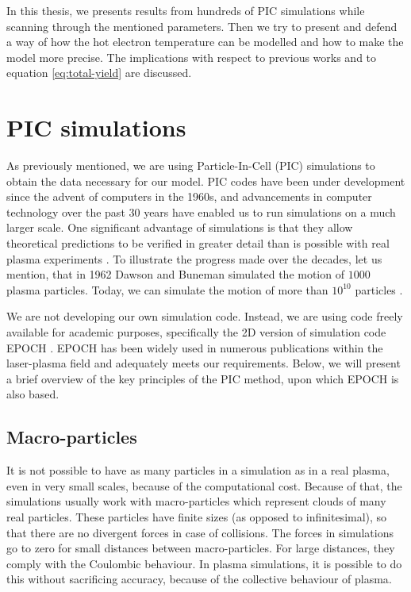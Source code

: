 In this thesis, we presents results from hundreds of PIC simulations while scanning through the mentioned parameters. Then we try to present and  defend a way of how the hot electron temperature can be modelled and how to make the model more precise. The implications with respect to previous works and to equation \ref{eq:total-yield} are discussed.

\section{PIC simulations}
As previously mentioned, we are using Particle-In-Cell (PIC) simulations to obtain the data necessary for our model. PIC codes have been under development since the advent of computers in the 1960s, and advancements in computer technology over the past 30 years have enabled us to run simulations on a much larger scale. One significant advantage of simulations is that they allow theoretical predictions to be verified in greater detail than is possible with real plasma experiments \cite{dawson1962}. To illustrate the progress made over the decades, let us mention, that in 1962 Dawson and Buneman simulated the motion of $1000$ plasma particles. Today, we can simulate the motion of more than $10^{10}$ particles \cite{tskhakaya2007}.

We are not developing our own simulation code. Instead, we are using code freely available for academic purposes, specifically the 2D version of simulation code EPOCH \cite{arber2015}. EPOCH has been widely used in numerous publications within the laser-plasma field and adequately meets our requirements. Below, we will present a brief overview of the key principles of the PIC method, upon which EPOCH is also based.

\subsection*{Macro-particles}
It is not possible to have as many particles in a simulation as in a real plasma, even in very small scales, because of the computational cost. Because of that, the simulations usually work with macro-particles which represent clouds of many real particles. These particles have finite sizes (as opposed to infinitesimal), so that there are no divergent forces in case of collisions. The forces in simulations go to zero for small distances between macro-particles. For large distances, they comply with the Coulombic behaviour. In plasma simulations, it is possible to do this without sacrificing accuracy, because of the collective behaviour of plasma\cite{fonseca2009}.

